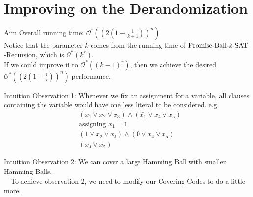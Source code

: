 \documentclass[pdf] {beamer}
\newcommand{\SAT}{\textnormal{$k$-SAT}}
\newcommand{\PBS}{\textnormal{Promise-Ball-$\SAT$}}
\renewcommand{\O}{\mathcal{O}^*}
\begin{document}
\section{Improving on the Derandomization}
	\begin{frame}{Aim}
	Overall running time: $\O((2(1-\frac{1}{k+1}))^n)$\\
	Notice that the parameter $k$ comes from the running time of $\PBS$-Recursion, which is $\O(k^r)$.\\
	If we could improve it to $\O((k-1)^r)$, then we achieve the desired $\O((2(1-\frac{1}{k}))^n)$ performance.
	\end{frame}
	\begin{frame}{Intuition}
	Observation 1: Whenever we fix an assignment for a variable, all clauses containing the variable would have one less literal to be considered. e.g.
	\begin{align*}
	&(x_1 \lor x_2 \lor x_3) \land (\bar{x_1} \lor x_4 \lor x_5)\\
	&\text{assigning }x_1 = 1\\
	&(1 \lor x_2 \lor x_3) \land (0 \lor x_4 \lor x_5)\\
	&(x_4 \lor x_5)
	\end{align*}
	\end{frame}	
	\begin{frame}{Intuition}
	Observation 2: We can cover a large Hamming Ball with smaller Hamming Balls. \\~\
	To achieve observation 2, we need to modify our Covering Codes to do a little more.
	\end{frame}	
\end{document}
